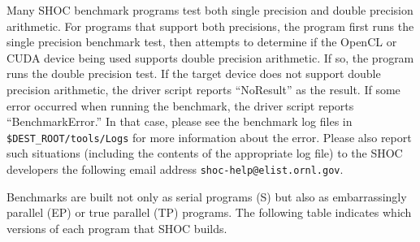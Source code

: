 \documentclass[11pt]{article}
\begin{document}
Many SHOC benchmark programs test both single precision and double precision
arithmetic.
For programs that support both precisions, the program first runs the
single precision benchmark test, then attempts to determine if the 
OpenCL or CUDA device being used supports double precision arithmetic.
If so, the program runs the double precision test.
If the target device does not support double precision arithmetic, the 
driver script reports ``NoResult'' as the result.
If some error occurred when running the benchmark, the driver script reports
``BenchmarkError.''
In that case, please see the benchmark log files in 
\verb+$DEST_ROOT/tools/Logs+ for more information about the error.
Please also report such situations (including the contents of the appropriate
log file) to the SHOC developers the following email address 
\verb+shoc-help@elist.ornl.gov+.

Benchmarks are built not only as serial programs (S) but also as 
embarrassingly parallel (EP) or true parallel (TP) programs. 
The following table indicates which versions of each program that 
SHOC builds.
\end{document}
